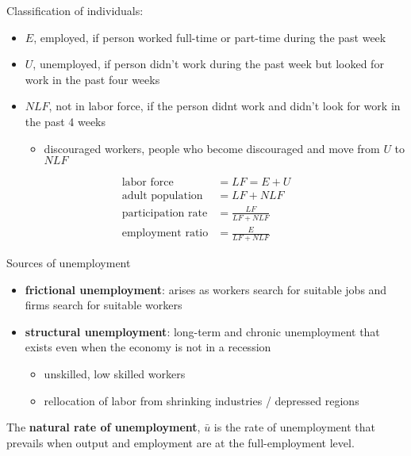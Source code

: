 \documentclass[letterpaper, 9pt,landscape]{extarticle}
\begin{document}
\begin{multicols*}{5}
\begin{remark}
    Classification of individuals:
    \begin{itemize}
        \item $E$, employed, if person worked full-time or part-time during the past week
        \item $U$, unemployed, if person didn't work during the past week but looked for work in the past four weeks
        \item $NLF$, not in labor force, if the person didnt work and didn't look for work in the past 4 weeks
        \begin{itemize}
            \item discouraged workers, people who become discouraged and move from $U$ to $NLF$
        \end{itemize} 
    \end{itemize} 
    \begin{align*}
        \text{labor force} &= LF =  E + U \\
        \text{adult population} &= LF + NLF \\
        \text{participation rate} &= \frac{LF}{LF + NLF} \\
        \text{employment ratio} &= \frac{E}{LF + NLF}
    \end{align*}
\end{remark}

\begin{remark}
    Sources of unemployment 
    \begin{itemize}
        \item \textbf{frictional unemployment}: arises as workers search for suitable jobs and firms search for suitable workers
        \item \textbf{structural unemployment}: long-term and chronic unemployment that exists even when the economy is not in a recession
        \begin{itemize}
            \item unskilled, low skilled workers
            \item rellocation of labor from shrinking industries / depressed regions
        \end{itemize} 
    \end{itemize} 
\end{remark}

\begin{definition}
    The \textbf{natural rate of unemployment}, $ \bar{u} $ is the rate of unemployment that prevails when output and employment are at the full-employment level. \\


\end{definition}
\end{multicols*}
\end{document}
